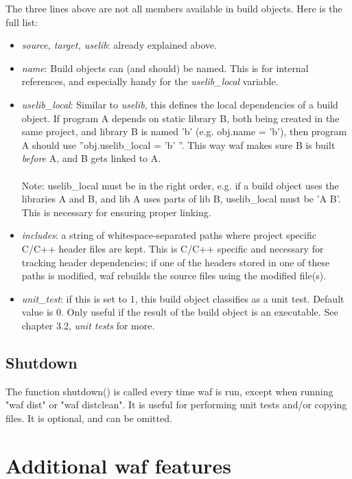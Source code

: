 \documentclass[a4,10pt]{article}
\begin{document}
\vspace{10mm}
The three lines above are not all members available in build objects. Here is the full list:
\begin{itemize}

\item \emph{source, target, uselib}: already explained above.

\item \emph{name}: Build objects can (and should) be named. This is for internal references, and especially handy for the \emph{uselib\_local} variable.

\item \emph{uselib\_local}: Similar to \emph{uselib}, this defines the local dependencies of a build object. If program A depends on static library B, both being created in the same project, and library B is named 'b' (e.g. obj.name = 'b'), then program A should use ''obj.uselib\_local = 'b' ''. This way waf makes sure B is built \emph{before} A, and B gets linked to A.\\
\\
Note: uselib\_local must be in the right order, e.g. if a build object uses the libraries A and B, and lib A uses parts of lib B, uselib\_local must be 'A B'. This is necessary for ensuring proper linking.

\item \emph{includes}: a string of whitespace-separated paths where project specific C/C++ header files are kept. This is C/C++ specific and necessary for tracking header dependencies; if one of the headers stored in one of these paths is modified, waf rebuilds the source files using the modified file(s).

\item \emph{unit\_test}: if this is set to 1, this build object classifies as a unit test. Default value is 0. Only useful if the result of the build object is an executable. See chapter 3.2, \emph{unit tests} for more.

\end{itemize}

\subsection{Shutdown}
The function shutdown() is called every time waf is run, except when running "waf dist" or "waf distclean". It is useful for performing unit tests and/or copying files. It is optional, and can be omitted.


\section{Additional waf features}
\end{document}
